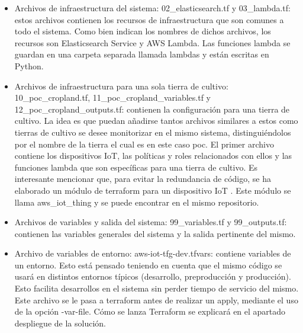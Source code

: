 \documentclass[../../memoria.tex]{subfiles}
\begin{document}
\begin{enumerate}
\begin{itemize}
              \item Archivos de infraestructura del sistema: 02\_elasticsearch.tf y 03\_lambda.tf: estos archivos contienen los recursos de infraestructura que son comunes a todo el sistema. Como bien indican los nombres de dichos archivos, los recursos son Elasticsearch Service y AWS Lambda. Las funciones lambda se guardan en una carpeta separada llamada lambdas y están escritas en Python.

              \item Archivos de infraestructura para una sola tierra de cultivo: 10\_poc\_cropland.tf, 11\_poc\_cropland\_variables.tf y 12\_poc\_cropland\_outputs.tf: contienen la configuración para una tierra de cultivo. La idea es que puedan añadirse tantos archivos similares a estos como tierras de cultivo se desee monitorizar en el mismo sistema, distinguiéndolos por el nombre de la tierra el cual es en este caso poc. El primer archivo contiene los dispositivos IoT, las políticas y roles relacionados con ellos y las funciones lambda que son específicas para una tierra de cultivo. Es interesante mencionar que, para evitar la redundancia de código, se ha elaborado un módulo de terraform para un dispositivo IoT \cite{terraformmodules}. Este módulo se llama aws\_iot\_thing y se puede encontrar en el mismo repositorio.

              \item Archivos de variables y salida del sistema: 99\_variables.tf y 99\_outputs.tf: contienen las variables generales del sistema y la salida pertinente del mismo.

              \item Archivo de variables de entorno: aws-iot-tfg-dev.tfvars: contiene variables de un entorno. Esto está pensado teniendo en cuenta que el mismo código se usará en distintos entornos típicos (desarrollo, preproducción y producción). Esto facilita desarrollos en el sistema sin perder tiempo de servicio del mismo. Este archivo se le pasa a terraform antes de realizar un apply, mediante el uso de la opción -var-file. Cómo se lanza Terraform se explicará en el apartado despliegue de la solución.
          \end{itemize}

\end{enumerate}
\end{document}
